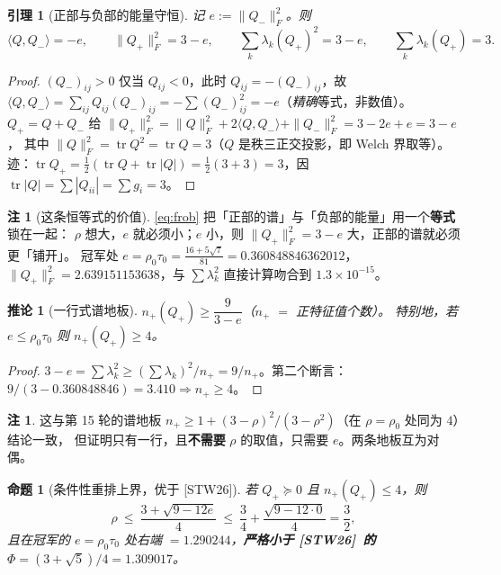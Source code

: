 \documentclass[UTF8,11pt]{ctexart}
\newtheorem{proposition}[theorem]{命题}
\newtheorem{lemma}[theorem]{引理}
\newtheorem{corollary}[theorem]{推论}
\theoremstyle{definition}
\newtheorem{remark}[theorem]{注}
\newcommand{\tr}{\operatorname{tr}}
\newcommand{\STW}{\textup{[STW26]}}
\begin{document}
\begin{lemma}[正部与负部的能量守恒]\label{lem:frob}
记 $e:=\|Q_-\|_F^2$。则
\begin{equation}\label{eq:frob}
\langle Q,Q_-\rangle=-e,\qquad \|Q_+\|_F^2=3-e,\qquad \sum_k\lambda_k(Q_+)^2=3-e,\qquad \sum_k\lambda_k(Q_+)=3 .
\end{equation}
\end{lemma}

\begin{proof}
$(Q_-)_{ij}>0$ 仅当 $Q_{ij}<0$，此时 $Q_{ij}=-(Q_-)_{ij}$，故
$\langle Q,Q_-\rangle=\sum_{ij}Q_{ij}(Q_-)_{ij}=-\sum(Q_-)_{ij}^2=-e$（\emph{精确}等式，非数值）。
$Q_+=Q+Q_-$ 给 $\|Q_+\|_F^2=\|Q\|_F^2+2\langle Q,Q_-\rangle+\|Q_-\|_F^2=3-2e+e=3-e$，
其中 $\|Q\|_F^2=\tr Q^2=\tr Q=3$（$Q$ 是秩三正交投影，即 Welch 界取等）。
迹：$\tr Q_+=\tfrac12(\tr Q+\tr|Q|)=\tfrac12(3+3)=3$，因 $\tr|Q|=\sum|Q_{ii}|=\sum g_i=3$。
\end{proof}

\begin{remark}[这条恒等式的价值]\label{rmk:frobval}
\eqref{eq:frob} 把「正部的谱」与「负部的能量」用一个\textbf{等式}锁在一起：
$\rho$ 想大，$e$ 就必须小；$e$ 小，则 $\|Q_+\|_F^2=3-e$ 大，正部的谱就必须更「铺开」。
冠军处 $e=\rho_0\tau_0=\frac{16+5\sqrt7}{81}=0.360848846362012$，
$\|Q_+\|_F^2=2.639151153638$，与 $\sum\lambda_k^2$ 直接计算吻合到 $1.3\times10^{-15}$。
\end{remark}

\begin{corollary}[一行式谱地板]\label{cor:floor2}
$n_+(Q_+)\ge\dfrac{9}{3-e}$（$n_+$ $=$ 正特征值个数）。
特别地，若 $e\le\rho_0\tau_0$ 则 $n_+(Q_+)\ge4$。
\end{corollary}

\begin{proof}
$3-e=\sum\lambda_k^2\ge(\sum\lambda_k)^2/n_+=9/n_+$。第二个断言：$9/(3-0.360848846)=3.410\Rightarrow n_+\ge4$。
\end{proof}

\begin{remark}
这与第 15 轮的谱地板 $n_+\ge1+(3-\rho)^2/(3-\rho^2)$（在 $\rho=\rho_0$ 处同为 $4$）结论一致，
但证明只有一行，且\textbf{不需要} $\rho$ 的取值，只需要 $e$。两条地板互为对偶。
\end{remark}

\begin{proposition}[条件性重排上界，优于 \STW]\label{prop:majbound}
若 $Q_+\succeq0$ 且 $n_+(Q_+)\le4$，则
\begin{equation}\label{eq:majbound}
\rho\ \le\ \frac{3+\sqrt{9-12e}}{4}\ \le\ \frac34+\frac{\sqrt{9-12\cdot0}}4=\frac32 ,
\end{equation}
且在冠军的 $e=\rho_0\tau_0$ 处右端 $=1.290244$，\textbf{严格小于 \STW\ 的 $\Phi=(3+\sqrt5)/4=1.309017$}。
\end{proposition}
\end{document}
